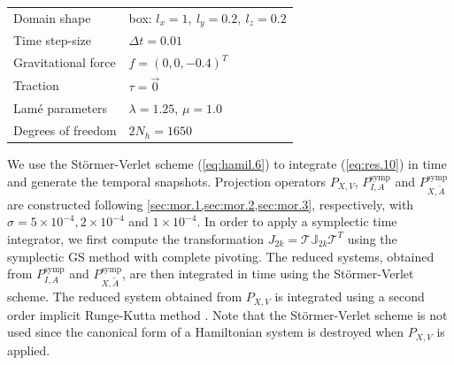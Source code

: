 \vspace{0.5cm}
\begin{center}
\begin{tabular}{|l|l|}
\hline
Domain shape & box: $l_x = 1,\ l_y = 0.2,\ l_z = 0.2$ \\
Time step-size & $\Delta t = 0.01$ \\
Gravitational force & $f = (0,0,-0.4)^T$ \\
Traction & $\tau = \vec 0$ \\
Lam\'e parameters & $\lambda = 1.25$, $\mu = 1.0$ \\
Degrees of freedom & $2N_{h} = 1650$ \\
\hline
\end{tabular}
\end{center}
\vspace{0.5cm}
We use the St\"ormer-Verlet scheme (\ref{eq:hamil.6}) to integrate (\ref{eq:res.10}) in time and generate the temporal snapshots. Projection operators $P_{X,V}$, $P^{\text{symp}}_{I,A}$ and $P^{\text{symp}}_{X,\tilde A}$ are constructed following \cref{sec:mor.1,sec:mor.2,sec:mor.3}, respectively, with $\sigma = 5\times 10^{-4}, 2\times 10^{-4}$ and $1\times 10^{-4}$. In order to apply a symplectic time integrator, we first compute the transformation $J_{2k} = \mathcal T \mathbb J_{2k} \mathcal T^T$ using the symplectic GS method with complete pivoting. The reduced systems, obtained from $P^{\text{symp}}_{I,A}$ and $P^{\text{symp}}_{X,\tilde A}$, are then integrated in time using the St\"ormer-Verlet scheme. The reduced system obtained from $P_{X,V}$ is integrated using a second order implicit Runge-Kutta method . Note that the St\"ormer-Verlet scheme is not used since the canonical form of a Hamiltonian system is destroyed when $P_{X,V}$ is applied.

